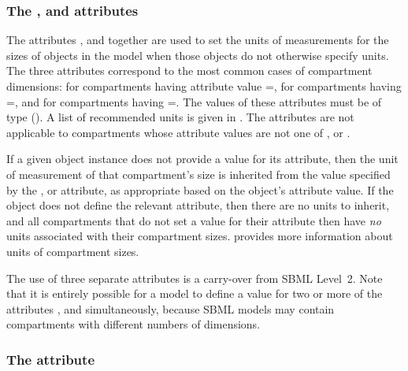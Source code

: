 \subsubsection{The ,  and
   attributes}
\label{sec:model-volumeUnits}
\label{sec:model-areaUnits}
\label{sec:model-lengthUnits}
\label{volumeunits}
\label{areaunits}
\label{lengthunits}

The attributes ,  and
 together are used to set the units of
measurements for the sizes of \Compartment objects in the model
when those objects do not otherwise specify units.  The three
attributes correspond to the most common cases of compartment
dimensions:  for compartments having attribute
value =,  for
compartments having =, and
 for compartments having
=.  The values of these attributes
must be of type 
().  A list of recommended units is
given in .
The attributes are not applicable to compartments whose
 attribute values are not one of ,
 or .

If a given \Compartment object instance does not provide a value
for its  attribute, then the unit of measurement of
that compartment's size is inherited from the value specified by
the \Model {},  or
 attribute, as appropriate based on the
\Compartment object's  attribute value.
If the \Model object does not define the relevant attribute, then
there are no units to inherit, and all compartments that do not
set a value for their  attribute then have \emph{no}
units associated with their compartment sizes.
 provides more information
about units of compartment sizes.

The use of three separate attributes is a carry-over from SBML
Level~2.  Note that it is entirely possible for a model to define
a value for two or more of the attributes ,
 and  simultaneously, because
SBML models may contain compartments with different numbers of
dimensions.


\subsubsection{The  attribute}
\label{sec:model-extentUnits}
\label{extentunits}

